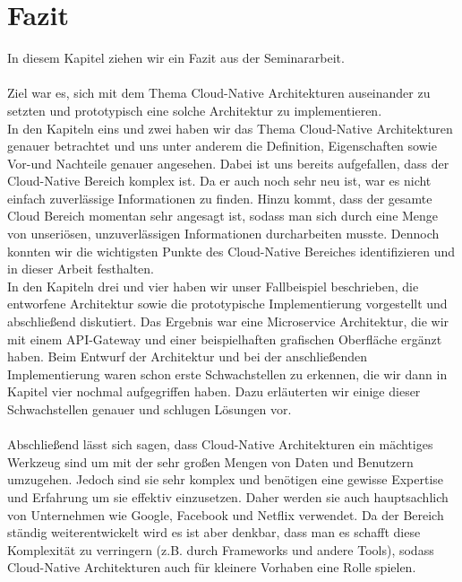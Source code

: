 \chapter{Fazit}
In diesem Kapitel ziehen wir ein Fazit aus der Seminararbeit.\\
\\
Ziel war es, sich mit dem Thema Cloud-Native Architekturen auseinander zu setzten und prototypisch eine solche Architektur zu implementieren.\\
In den Kapiteln eins und zwei haben wir das Thema Cloud-Native Architekturen genauer betrachtet und uns unter anderem die Definition, Eigenschaften sowie Vor-und Nachteile genauer angesehen. Dabei ist uns bereits aufgefallen, dass der Cloud-Native Bereich komplex ist. Da er auch noch sehr neu ist, war es nicht einfach zuverlässige Informationen zu finden. Hinzu kommt, dass der gesamte Cloud Bereich momentan sehr angesagt ist, sodass man sich durch eine Menge von unseriösen, unzuverlässigen Informationen durcharbeiten musste. Dennoch konnten wir die wichtigsten Punkte des Cloud-Native Bereiches identifizieren und in dieser Arbeit festhalten.\\
In den Kapiteln drei und vier haben wir unser Fallbeispiel beschrieben, die entworfene Architektur sowie die prototypische Implementierung vorgestellt und abschließend diskutiert. Das Ergebnis war eine Microservice Architektur, die wir mit einem API-Gateway und einer beispielhaften grafischen Oberfläche ergänzt haben. Beim Entwurf der Architektur und bei der anschließenden Implementierung waren schon erste Schwachstellen zu erkennen, die wir dann in Kapitel vier nochmal aufgegriffen haben. Dazu erläuterten wir einige dieser Schwachstellen genauer und schlugen Lösungen vor.\\
\\
Abschließend lässt sich sagen, dass Cloud-Native Architekturen ein mächtiges Werkzeug sind um mit der sehr großen Mengen von Daten und Benutzern umzugehen. Jedoch sind sie sehr komplex und benötigen eine gewisse Expertise und Erfahrung um sie effektiv einzusetzen. Daher werden sie auch hauptsachlich von Unternehmen wie Google, Facebook und Netflix verwendet. Da der Bereich ständig weiterentwickelt wird es ist aber denkbar, dass man es schafft diese Komplexität zu verringern (z.B. durch Frameworks und andere Tools), sodass Cloud-Native Architekturen auch für kleinere Vorhaben eine Rolle spielen.


